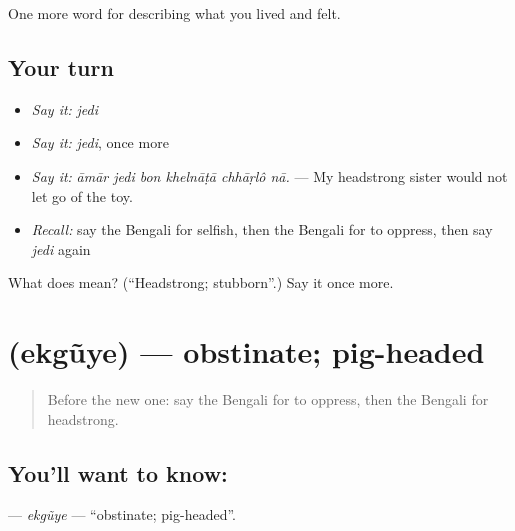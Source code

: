 \begin{grammarlens}[title={What you've built}]
One more word for describing what you lived and felt.
\end{grammarlens}

\subsection*{Your turn}
\begin{itemize}
\raggedright
  \item \emph{Say it:} \emph{jedi}
  \item \emph{Say it:} \emph{jedi}, once more
  \item \emph{Say it:} \emph{āmār jedi bon khelnāṭā chhāṛlô nā.} — My headstrong sister would not let go of the toy.
  \item \emph{Recall:} say the Bengali for selfish, then the Bengali for to oppress, then say \emph{jedi} again
\end{itemize}

\begin{tcolorbox}[breakable,colback=teal!4,colframe=teal!35!black,title={Before you move on}]
What does  mean? (\textquotedblleft{}Headstrong; stubborn\textquotedblright{}.) Say it once more.
\end{tcolorbox}
\section[\texorpdfstring{\bn{একগুঁয়ে} (ekgũye)}{একগুঁয়ে (ekgũye)}]{ (ekgũye) — obstinate; pig-headed}

\label{lesson:BN-C461-ekguye}



\begin{quote}
Before the new one: say the Bengali for to oppress, then the Bengali for headstrong.
\end{quote}

\subsection*{You'll want to know: }
\textbf{} — \emph{ekgũye} — \textquotedblleft{}obstinate; pig-headed\textquotedblright{}.

\begin{quote}
       
\end{quote}

